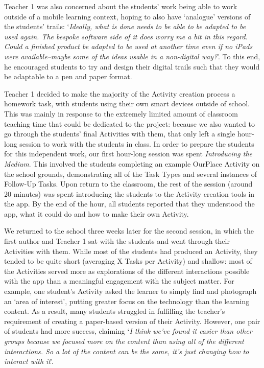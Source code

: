 \documentclass[,hyphens]{sigchi}
\begin{document}
Teacher 1 was also concerned about the students' work being able to work outside of a mobile learning context, hoping to also have `analogue' versions of the students' trails: `\textit{Ideally, what is done needs to be able to be adapted to be used again. The bespoke software side of it does worry me a bit in this regard. Could a finished product be adapted to be used at another time even if no iPads were available--maybe some of the ideas usable in a non-digital way?}'. To this end, he encouraged students to try and design their digital trails such that they would be adaptable to a pen and paper format.

Teacher 1 decided to make the majority of the Activity creation process a homework task, with students using their own smart devices outside of school. This was mainly in response to the extremely limited amount of classroom teaching time that could be dedicated to the project: because we also wanted to go through the students' final Activities with them, that only left a single hour-long session to work with the students in class. In order to prepare the students for this independent work, our first hour-long session was spent \textit{Introducing the Medium}. This involved the students completing an example OurPlace Activity on the school grounds, demonstrating all of the Task Types and several instances of Follow-Up Tasks. Upon return to the classroom, the rest of the session (around 20 minutes) was spent introducing the students to the Activity creation tools in the app. By the end of the hour, all students reported that they understood the app, what it could do and how to make their own Activity.

We returned to the school three weeks later for the second session, in which the first author and Teacher 1 sat with the students and went through their Activities with them. While most of the students had produced an Activity, they tended to be quite short (averaging X Tasks per Activity) and shallow: most of the Activities served more as explorations of the different interactions possible with the app than a meaningful engagement with the subject matter. For example, one student's Activity asked the learner to simply find and photograph an `area of interest', putting greater focus on the technology than the learning content. As a result, many students struggled in fulfilling the teacher's requirement of creating a paper-based version of their Activity. However, one pair of students had more success, claiming `\textit{I think we've found it easier than other groups because we focused more on the content than using all of the different interactions. So a lot of the content can be the same, it's just changing how to interact with it}'. 
\end{document}
